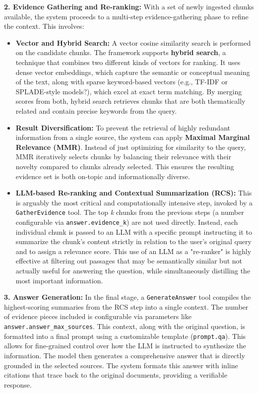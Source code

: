 \textbf{2. Evidence Gathering and Re-ranking:}
With a set of newly ingested chunks available, the system proceeds to a multi-step evidence-gathering phase to refine the context. This involves:
\begin{itemize}
    \item \textbf{Vector and Hybrid Search:} A vector cosine similarity search is performed on the candidate chunks. The framework supports \textbf{hybrid search}, a technique that combines two different kinds of vectors for ranking. It uses dense vector embeddings, which capture the semantic or conceptual meaning of the text, along with sparse keyword-based vectors (e.g., TF-IDF or SPLADE-style models?), which excel at exact term matching. By merging scores from both, hybrid search retrieves chunks that are both thematically related and contain precise keywords from the query. 
    \item \textbf{Result Diversification:} To prevent the retrieval of highly redundant information from a single source, the system can apply \textbf{Maximal Marginal Relevance (MMR)}. Instead of just optimizing for similarity to the query, MMR iteratively selects chunks by balancing their relevance with their novelty compared to chunks already selected. This ensures the resulting evidence set is both on-topic and informationally diverse.
    \item \textbf{LLM-based Re-ranking and Contextual Summarization (RCS):} This is arguably the most critical and computationally intensive step, invoked by a \texttt{GatherEvidence} tool. The top \textit{k} chunks from the previous steps (a number configurable via \texttt{answer.evidence\_k}) are not used directly. Instead, each individual chunk is passed to an LLM with a specific prompt instructing it to summarize the chunk's content strictly in relation to the user's original query and to assign a relevance score. This use of an LLM as a "re-ranker" is highly effective at filtering out passages that may be semantically similar but not actually useful for answering the question, while simultaneously distilling the most important information.
\end{itemize}

\textbf{3. Answer Generation:}
In the final stage, a \texttt{GenerateAnswer} tool compiles the highest-scoring summaries from the RCS step into a single context. The number of evidence pieces included is configurable via parameters like \texttt{answer.answer\_max\_sources}. This context, along with the original question, is formatted into a final prompt using a customizable template (\texttt{prompt.qa}). This allows for fine-grained control over how the LLM is instructed to synthesize the information. The model then generates a comprehensive answer that is directly grounded in the selected sources. The system formats this answer with inline citations that trace back to the original documents, providing a verifiable response. \\

